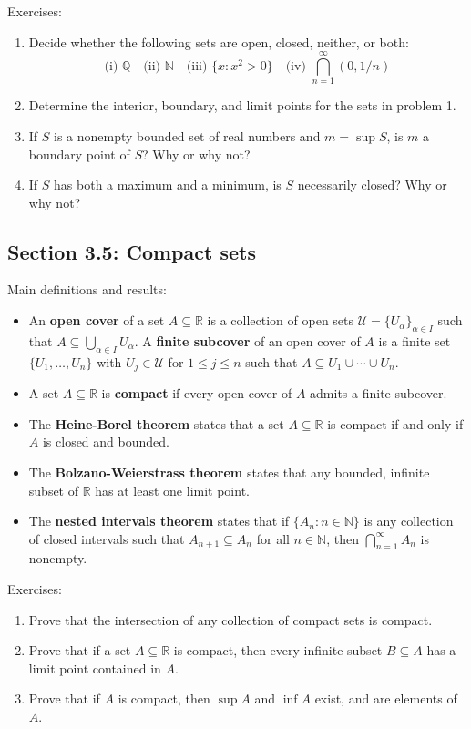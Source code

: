 \documentclass[letterpaper,12pt]{article}
\newcommand{\N}{\mathbb{N}}
\newcommand{\Q}{\mathbb{Q}}
\newcommand{\R}{\mathbb{R}}
\begin{document}
\noindent Exercises:
\begin{enumerate}
 \item Decide whether the following sets are open, closed, neither, or both:
\[
\text{(i) } \Q \quad \text{(ii) } \N \quad \text{(iii) }\{x : x^2>0\} \quad \text{(iv) } \bigcap_{n=1}^\infty (0,1/n)
\]
 \item Determine the interior, boundary, and limit points for the sets in problem 1.
 \item If $S$ is a nonempty bounded set of real numbers and $m=\sup S$, is $m$ a boundary point of $S$? Why or why not?
 \item If $S$ has both a maximum and a minimum, is $S$ necessarily closed? Why or why not?
\end{enumerate}
\subsection*{Section 3.5: Compact sets}
Main definitions and results:
\begin{itemize}
 \item An {\bf open cover} of a set $A\subseteq \R$ is a collection of open sets $\mathcal{U} = \{U_\alpha\}_{\alpha\in I}$ such that $A\subseteq \bigcup_{\alpha\in I}U_\alpha$. A {\bf finite subcover} of an open cover of $A$ is a finite set $\{U_1,\ldots, U_n\}$ with $U_j\in\mathcal{U}$ for $1\leq j\leq n$ such that $A\subseteq U_1\cup\cdots\cup U_n$.
 \item A set $A\subseteq \R$ is {\bf compact} if every open cover of $A$ admits a finite subcover.
 \item The {\bf Heine-Borel theorem} states that a set $A\subseteq \R$ is compact if and only if $A$ is closed and bounded.
 \item The {\bf Bolzano-Weierstrass theorem} states that any bounded, infinite subset of $\R$ has at least one limit point.
 \item The {\bf nested intervals theorem} states that if $\{A_n : n\in\N\}$ is any collection of closed intervals such that $A_{n+1}\subseteq A_n$ for all $n\in\N$, then $\bigcap_{n=1}^\infty A_n$ is nonempty.
\end{itemize}

\noindent Exercises:

\begin{enumerate}
 \item Prove that the intersection of any collection of compact sets is compact.
 \item Prove that if a set $A\subseteq\R$ is compact, then every infinite subset $B\subseteq A$ has a limit point contained in $A$.
 \item Prove that if $A$ is compact, then $\sup A$ and $\inf A$ exist, and are elements of $A$.
\end{enumerate}
\end{document}
